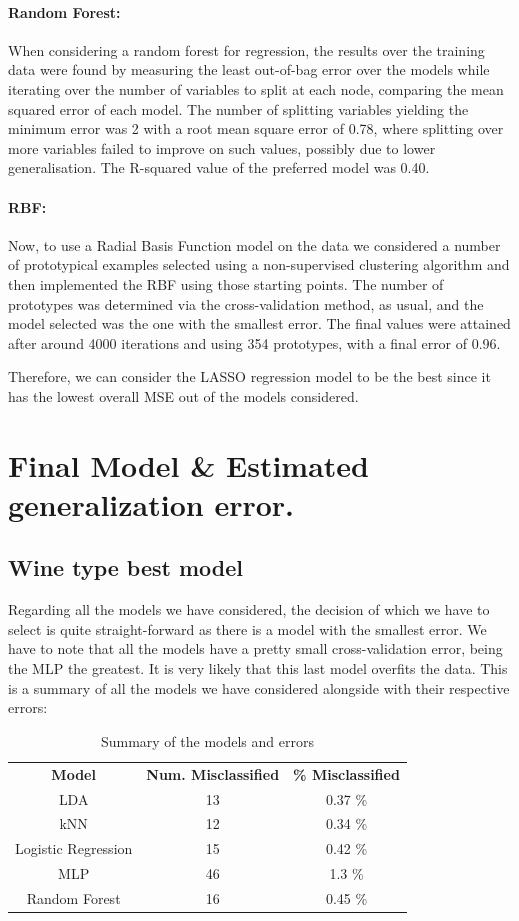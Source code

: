 \documentclass[10pt]{article}
\begin{document}
\paragraph{Random Forest:}

When considering a random forest for regression, the results over the training data were found by measuring the least out-of-bag error over the models while iterating over the number of variables to split at each node, comparing the mean squared error of each model. The number of splitting variables yielding the minimum error was 2 with a root mean square error of 0.78, where splitting over more variables failed to improve on such values, possibly due to lower generalisation. The R-squared value of the preferred model was 0.40.

\paragraph{RBF:}

Now, to use a Radial Basis Function model on the data we considered a number of prototypical examples selected using a non-supervised clustering algorithm and then implemented the RBF using those starting points. The number of prototypes was determined via the cross-validation method, as usual, and the model selected was the one with the smallest error. The final values were attained after around 4000 iterations and using 354 prototypes, with a final error of 0.96.

Therefore, we can consider the LASSO regression model to be the best since it has the lowest overall MSE out of the models considered.

\section{Final Model \& Estimated generalization error.}
\subsection{Wine type best model}
Regarding all the models we have considered, the decision of which we have to select is quite straight-forward as there is a model with the smallest error. We have to note that all the models have a pretty small cross-validation error, being the MLP the greatest. It is very likely that this last model overfits the data. This is a summary of all the models we have considered alongside with their respective errors:

\begin{table}[H]
\centering
\caption{Summary of the models and errors}
\begin{tabular}{ccc}
\textbf{Model} & \textbf{Num. Misclassified} & \textbf{\% Misclassified} \\
LDA & 13 & 0.37 \% \\
kNN & 12 & 0.34 \% \\
Logistic Regression & 15 & 0.42 \% \\
MLP & 46 & 1.3 \% \\
Random Forest & 16 & 0.45 \%
\end{tabular}
\end{table}
\end{document}
